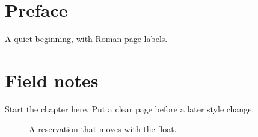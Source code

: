 \documentclass[11pt,a4paper,twoside]{book}
\begin{document}
\frontmatter
\chapter{Preface}
A quiet beginning, with Roman page labels.
\florilegiumdivider
\mainmatter
{}
\chapter{Field notes}
Start the chapter here. Put a clear page before a later style change.
\begin{figure}[ht]
  \begin{florilegiumprotect}[4mm]
    \centering{}
    \caption{A reservation that moves with the float.}
  \end{florilegiumprotect}
\end{figure}
\end{document}
